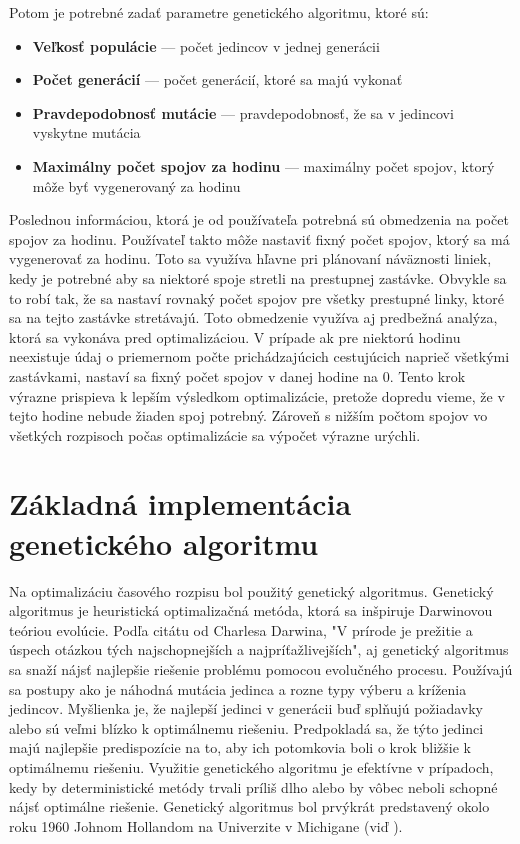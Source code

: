Potom je potrebné zadať parametre genetického algoritmu, ktoré sú:
\begin{itemize}
  \item \textbf{Veľkosť populácie} --- počet jedincov v jednej generácii
  \item \textbf{Počet generácií} --- počet generácií, ktoré sa majú vykonať
  \item \textbf{Pravdepodobnosť mutácie} --- pravdepodobnosť, že sa v jedincovi vyskytne mutácia
  \item \textbf{Maximálny počet spojov za hodinu} --- maximálny počet spojov, ktorý môže byť vygenerovaný za hodinu
\end{itemize}
Poslednou informáciou, ktorá je od používateľa potrebná sú obmedzenia na počet spojov za hodinu.
Používateľ takto môže nastaviť fixný počet spojov, ktorý sa má vygenerovať za hodinu.
Toto sa využíva hľavne pri plánovaní náväznosti liniek, kedy je potrebné aby sa niektoré spoje stretli na prestupnej zastávke.
Obvykle sa to robí tak, že sa nastaví rovnaký počet spojov pre všetky prestupné linky, ktoré sa na tejto zastávke stretávajú.
Toto obmedzenie využíva aj predbežná analýza, ktorá sa vykonáva pred optimalizáciou.
V prípade ak pre niektorú hodinu neexistuje údaj o priemernom počte prichádzajúcich cestujúcich naprieč všetkými zastávkami, nastaví sa fixný počet spojov v danej hodine na 0.
Tento krok výrazne prispieva k lepším výsledkom optimalizácie, pretože dopredu vieme, že v tejto hodine nebude žiaden spoj potrebný.
Zároveň s nižším počtom spojov vo všetkých rozpisoch počas optimalizácie sa výpočet výrazne urýchli.

\section{Základná implementácia genetického algoritmu}
\label{implementacia_genetickeho_algoritmu}
Na optimalizáciu časového rozpisu bol použitý genetický algoritmus.
Genetický algoritmus je heuristická optimalizačná metóda, ktorá sa inšpiruje Darwinovou teóriou evolúcie.
Podľa citátu od Charlesa Darwina, "V prírode je prežitie a úspech otázkou tých najschopnejších a najpríťažlivejších",
aj genetický algoritmus sa snaží nájsť najlepšie riešenie problému pomocou evolučného procesu.
Používajú sa postupy ako je náhodná mutácia jedinca a rozne typy výberu a kríženia jedincov.
Myšlienka je, že najlepší jedinci v generácii buď splňujú požiadavky alebo sú veľmi blízko k optimálnemu riešeniu.
Predpokladá sa, že týto jedinci majú najlepšie predispozície na to, aby ich potomkovia boli o krok bližšie k optimálnemu riešeniu.
Využitie genetického algoritmu je efektívne v prípadoch, kedy by deterministické metódy trvali príliš dlho alebo by vôbec neboli schopné nájsť optimálne riešenie.
Genetický algoritmus bol prvýkrát predstavený okolo roku 1960 Johnom Hollandom na Univerzite v Michigane (viď \cite{9002372}).

